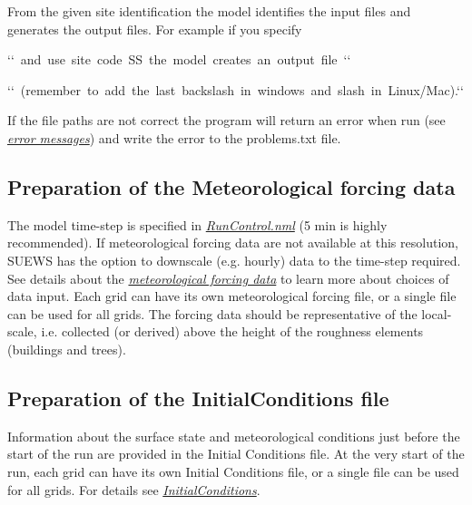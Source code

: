 \documentclass[letterpaper,10pt,english]{sphinxmanual}
\begin{document}
From the given site identification the model identifies the input files
and generates the output files. For example if you specify

\begin{DUlineblock}{0em}
\item[] `{}` and use site code SS the model creates an output file {}`{}`
\item[] `{}` (remember to add the last backslash in windows and slash in Linux/Mac).{}`{}`
\end{DUlineblock}

If the file paths are not correct the program will return an error when
run (see {\hyperref[\detokenize{prepare-to-run-the-model:Error_messages:_problems.txt}]{\emph{error messages}}}) and write
the error to the problems.txt file.


\subsection{Preparation of the Meteorological forcing data}
\label{\detokenize{prepare-to-run-the-model:preparation-of-the-meteorological-forcing-data}}
The model time-step is specified in {\hyperref[\detokenize{prepare-to-run-the-model:RunControl.nml}]{\emph{RunControl.nml}}}
(5 min is highly recommended). If meteorological forcing data are not
available at this resolution, SUEWS has the option to downscale (e.g.
hourly) data to the time-step required. See details about the
{\hyperref[\detokenize{prepare-to-run-the-model:SSss_YYYY_data_tt.txt}]{\emph{meteorological forcing data}}} to learn more
about choices of data input. Each grid can have its own meteorological
forcing file, or a single file can be used for all grids. The forcing
data should be representative of the local-scale, i.e. collected (or
derived) above the height of the roughness elements (buildings and
trees).


\subsection{Preparation of the InitialConditions file}
\label{\detokenize{prepare-to-run-the-model:preparation-of-the-initialconditions-file}}
Information about the surface state and meteorological conditions just
before the start of the run are provided in the Initial Conditions file.
At the very start of the run, each grid can have its own Initial
Conditions file, or a single file can be used for all grids. For details
see {\hyperref[\detokenize{prepare-to-run-the-model:InitialConditions}]{\emph{InitialConditions}}}.
\end{document}

